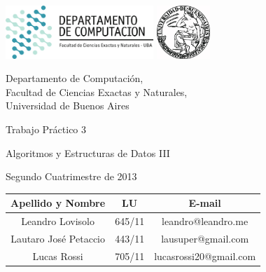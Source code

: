 \documentclass[a4paper, 10pt, twoside]{article}
\begin{document}


\thispagestyle{caratula}

\begin{center}

\includegraphics[height=2cm]{DC.png} 
\hfill
\includegraphics[height=2cm]{UBA.jpg} 

\vspace{2cm}

Departamento de Computación,\\
Facultad de Ciencias Exactas y Naturales,\\
Universidad de Buenos Aires

\vspace{4cm}

\begin{Huge}
Trabajo Práctico 3
\end{Huge}

\vspace{0.5cm}

\begin{Large}
Algoritmos y Estructuras de Datos III
\end{Large}

\vspace{1cm}

Segundo Cuatrimestre de 2013

\vspace{4cm}

\begin{tabular}{|c|c|c|}
\hline
Apellido y Nombre & LU & E-mail\\
\hline
Leandro Lovisolo      & 645/11 & leandro@leandro.me\\
Lautaro José Petaccio & 443/11 & lausuper@gmail.com\\
Lucas Rossi           & 705/11 & lucasrossi20@gmail.com\\
\hline
\end{tabular}

\end{center}
\end{document}
